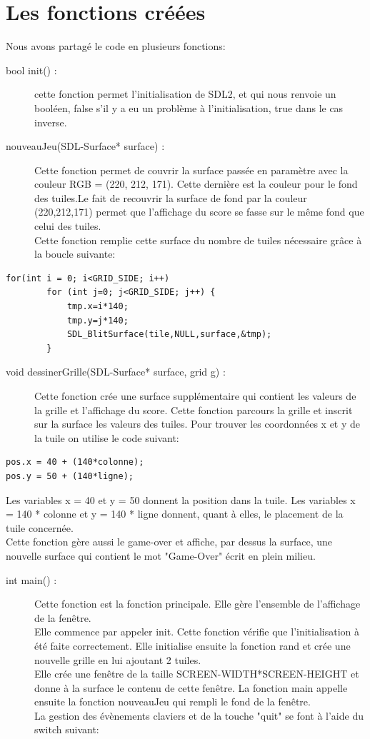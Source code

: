 \documentclass{report}
\begin{document}
\section{Les fonctions créées}
Nous avons partagé le code en plusieurs fonctions:
\begin{description}
\item[bool init() :] cette fonction permet l'initialisation de SDL2, et qui nous renvoie un booléen, false s'il y a eu un problème à l'initialisation, true dans le cas inverse.
\item[nouveauJeu(SDL-Surface* surface) :] Cette fonction permet de couvrir la surface passée en paramètre avec la couleur RGB = (220, 212, 171). Cette dernière est la couleur pour le fond des tuiles.Le fait de recouvrir la surface de fond par la couleur (220,212,171) permet que l'affichage du score se fasse sur le même fond que celui des tuiles.\\
Cette fonction remplie cette surface du nombre de tuiles nécessaire grâce à la boucle suivante:
\end{description}
\begin{lstlisting}[frame=single]
for(int i = 0; i<GRID_SIDE; i++)
        for (int j=0; j<GRID_SIDE; j++) {
            tmp.x=i*140;
            tmp.y=j*140;
            SDL_BlitSurface(tile,NULL,surface,&tmp);
        }
\end{lstlisting}
\begin{description}
\item[void dessinerGrille(SDL-Surface* surface, grid g) :] Cette fonction crée une surface supplémentaire qui contient les valeurs de la grille et l'affichage du score. Cette fonction  parcours la grille et inscrit sur la surface les valeurs des tuiles. Pour trouver les coordonnées x et y de la tuile on utilise le code suivant:
\end{description}
\begin{lstlisting}[frame=single]
pos.x = 40 + (140*colonne);
pos.y = 50 + (140*ligne);
\end{lstlisting}
Les variables x = 40 et y = 50 donnent la position dans la tuile. Les variables x = 140 * colonne et y = 140 * ligne donnent, quant à elles, le placement de la tuile concernée.\\
Cette fonction gère aussi le game-over et affiche, par dessus la surface, une nouvelle surface qui contient le mot "Game-Over" écrit en plein milieu.
\begin{description}
\item[int main() :] Cette fonction est la fonction principale. Elle gère l'ensemble de l'affichage de la fenêtre.\\
Elle commence par appeler init. Cette fonction vérifie que l'initialisation à été faite correctement. Elle initialise ensuite la fonction rand et crée une nouvelle grille en lui ajoutant 2 tuiles.\\
Elle crée une fenêtre de la taille SCREEN-WIDTH*SCREEN-HEIGHT et donne à la surface le contenu de cette fenêtre. La fonction main appelle ensuite la fonction nouveauJeu qui rempli le fond de la fenêtre.\\
La gestion des évènements claviers et de la touche "quit"  se font à l'aide du switch suivant:
\end{description}
\end{document}
